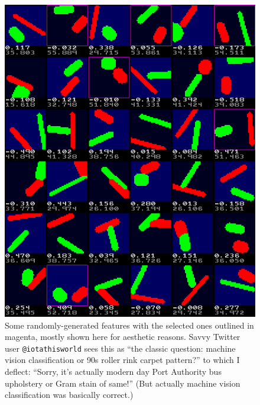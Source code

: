 \documentclass[twocolumn]{article}
\begin{document}
\begin{figure}[ht]
\centering
  \includegraphics[width=0.99 \linewidth]{makefeatures}
  \caption{ Some randomly-generated features with the selected ones
    outlined in magenta, mostly shown here for aesthetic reasons.
    Savvy Twitter user {\tt @iotathisworld} sees this as ``the classic
    question: machine vision classification or 90s roller rink carpet
    pattern?'' to which I deflect: ``Sorry, it's actually modern day
    Port Authority bus upholstery or Gram stain of same!'' (But
    actually machine vision classification was basically correct.)
  } \label{fig:makefeatures}
\end{figure}
\end{document}
